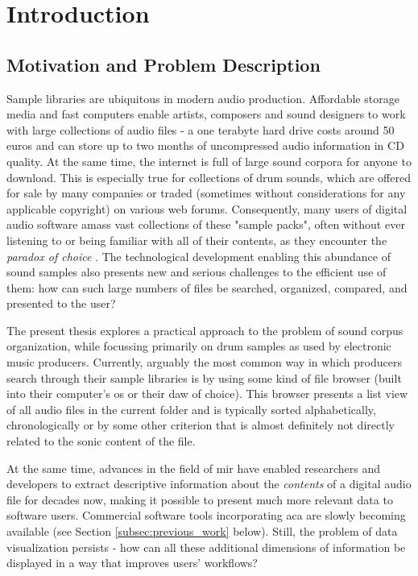 
\section{Introduction}
\label{sec:introduction}

\subsection{Motivation and Problem Description}
\label{subsec:motivation}
Sample libraries are ubiquitous in modern audio production. Affordable storage
media and fast computers enable artists, composers and sound designers to work
with large collections of audio files - a one terabyte hard drive costs around
50 euros and can store up to two months of uncompressed audio information in CD
quality. At the same time, the internet is full of large sound corpora for
anyone to download. This is especially true for collections of drum sounds,
which are offered for sale by many companies or traded (sometimes without
considerations for any applicable copyright) on various web forums.
Consequently, many users of digital audio software amass vast collections of
these "sample packs", often without ever listening to or being familiar with
all of their contents, as they encounter the \textit{paradox of choice}
\citep{schwartz2004}. The technological development enabling this abundance of
sound samples also presents new and serious challenges to the efficient use of
them: how can such large numbers of files be searched, organized, compared, and
presented to the user?

\bigskip

The present thesis explores a practical approach to the problem of sound corpus
organization, while focussing primarily on drum samples as used by electronic
music producers.
Currently, arguably the most common way in which producers
search through their sample libraries is by using some kind of file browser
(built into their computer's \gls{os} or their \gls{daw} of choice). This
browser presents a list view of all audio files in the current folder and is
typically sorted alphabetically, chronologically or by some other criterion that
is almost definitely not directly related to the sonic content of the file.

\smallskip

At the same time, advances in the field of \gls{mir} have enabled researchers
and developers to extract descriptive information about the \textit{contents}
of a digital audio file for decades now, making it possible to present much
more relevant data to software users. Commercial software tools incorporating
\gls{aca} are slowly becoming available (see Section \ref{subsec:previous_work}
below). Still, the problem of data visualization persists - how can all these
additional dimensions of information be displayed in a way that improves users'
workflows?


